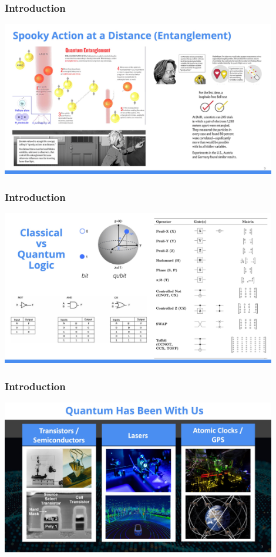 \documentclass{beamer}
\begin{document}
\begin{frame}\frametitle{Introduction}
\begin{center}
\includegraphics[width=12cm]{fig/Slide5.jpeg}
\end{center}
\end{frame}

\begin{frame}\frametitle{Introduction}
\begin{center}
\includegraphics[width=12cm]{fig/Slide6.jpeg}
\end{center}
\end{frame}

\begin{frame}\frametitle{Introduction}
\begin{center}
\includegraphics[width=12cm]{fig/Slide7.jpeg}
\end{center}
\end{frame}
\end{document}
